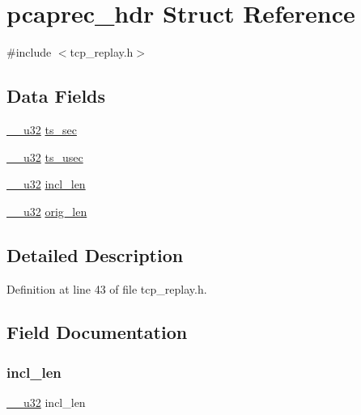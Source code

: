 \hypertarget{structpcaprec__hdr}{}\section{pcaprec\+\_\+hdr Struct Reference}
\label{structpcaprec__hdr}


{\ttfamily \#include $<$tcp\+\_\+replay.\+h$>$}

\subsection*{Data Fields}
\begin{DoxyCompactItemize}
\item 
\hyperlink{asm__types_8h_a3acae9310e2c2e411e800a8a369171c6}{\+\_\+\+\_\+u32} \hyperlink{structpcaprec__hdr_a5d774b9c74b1460b9594a1c604fc9998}{ts\+\_\+sec}
\item 
\hyperlink{asm__types_8h_a3acae9310e2c2e411e800a8a369171c6}{\+\_\+\+\_\+u32} \hyperlink{structpcaprec__hdr_a8787142fea574b3eee21c13377561e7e}{ts\+\_\+usec}
\item 
\hyperlink{asm__types_8h_a3acae9310e2c2e411e800a8a369171c6}{\+\_\+\+\_\+u32} \hyperlink{structpcaprec__hdr_afbcf147ce713d5dd59c2623d32601372}{incl\+\_\+len}
\item 
\hyperlink{asm__types_8h_a3acae9310e2c2e411e800a8a369171c6}{\+\_\+\+\_\+u32} \hyperlink{structpcaprec__hdr_a56477cfe7369b217f36fa41132e80926}{orig\+\_\+len}
\end{DoxyCompactItemize}


\subsection{Detailed Description}


Definition at line 43 of file tcp\+\_\+replay.\+h.



\subsection{Field Documentation}
\mbox{\label{structpcaprec__hdr_afbcf147ce713d5dd59c2623d32601372}} 
\subsubsection{\texorpdfstring{incl\+\_\+len}{incl\_len}}
{\footnotesize\ttfamily \hyperlink{asm__types_8h_a3acae9310e2c2e411e800a8a369171c6}{\+\_\+\+\_\+u32} incl\+\_\+len}



